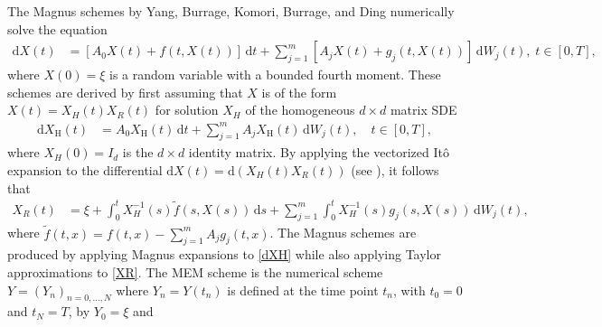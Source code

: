 \documentclass[onefignum]{siamart250211}
\begin{document}
The Magnus schemes by Yang, Burrage, Komori, Burrage, and Ding \cite{BurrageBurrage2021} numerically solve the equation
\begin{align}
\mathrm{d}X(t)&=[A_0X(t)\!+\!f(t,X(t))]\,\mathrm{d}t+\sum_{j=1}^m[A_jX(t)\!+\!g_j(t,X(t))]\,\mathrm{d}W_j(t),\;t\in[0,T],\label{Equation6}%
\end{align}
where $X(0)=\xi$ is a random variable with a bounded fourth moment. These schemes are derived by first assuming that $X$ is of the form $X(t)=X_H(t)X_R(t)$ for solution $X_H$ of the homogeneous $d\times d$ matrix SDE
\begin{align}
\mathrm{d}X_\mathrm{H}(t)&=A_0X_\mathrm{H}(t)\,\mathrm{d}t+\sum_{j=1}^mA_jX_\mathrm{H}(t)\,\mathrm{d}W_j(t),\quad t\in[0,T],\label{dXH}%
\end{align}
where $X_H(0)=I_d$ is the $d\times d$ identity matrix. By applying the vectorized It\^o expansion to the differential $\mathrm{d}X(t)=\mathrm{d}(X_H(t)X_R(t))$ (see \cite[page 6]{BurrageBurrage2021}), it follows that
\begin{align}
X_R(t)&=\xi+\int_0^tX_H^{-1}(s)\tilde{f}(s,X(s))\,\mathrm{d}s+\sum_{j=1}^m\int_0^tX_H^{-1}(s)g_j(s,X(s))\,\mathrm{d}W_j(t),\label{XR}
\end{align}
where $\tilde{f}(t,x)=f(t,x)-\sum_{j=1}^mA_jg_j(t,x)$. The Magnus schemes are produced by applying Magnus expansions to \cref{dXH} while also applying Taylor approximations to \cref{XR}. The MEM scheme is the numerical scheme $Y=(Y_n)_{n=0,\ldots,N}$ where $Y_n=Y(t_n)$ is defined at the time point $t_n$, with $t_0=0$ and $t_N=T$, by $Y_0=\xi$ and
\end{document}
